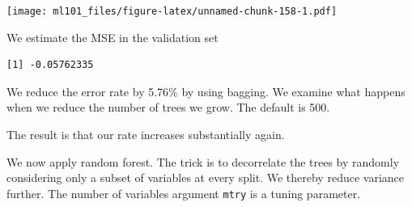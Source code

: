 \documentclass[]{article}
\newenvironment{Shaded}{\begin{snugshade}}{\end{snugshade}}
\newcommand{\CommentTok}[1]{\textcolor[rgb]{0.56,0.35,0.01}{\textit{#1}}}
\newcommand{\DataTypeTok}[1]{\textcolor[rgb]{0.13,0.29,0.53}{#1}}
\newcommand{\DecValTok}[1]{\textcolor[rgb]{0.00,0.00,0.81}{#1}}
\newcommand{\KeywordTok}[1]{\textcolor[rgb]{0.13,0.29,0.53}{\textbf{#1}}}
\newcommand{\NormalTok}[1]{#1}
\newcommand{\OperatorTok}[1]{\textcolor[rgb]{0.81,0.36,0.00}{\textbf{#1}}}
\newcommand{\OtherTok}[1]{\textcolor[rgb]{0.56,0.35,0.01}{#1}}
\newcommand{\StringTok}[1]{\textcolor[rgb]{0.31,0.60,0.02}{#1}}
\begin{document}
\texttt{[image: ml101\_files/figure-latex/unnamed-chunk-158-1.pdf]}

We estimate the MSE in the validation set

\begin{Shaded}
\end{Shaded}

\begin{verbatim}
[1] -0.05762335
\end{verbatim}

We reduce the error rate by 5.76\(\%\) by using bagging. We examine what happens when we reduce the number of trees we grow. The default is 500.

\begin{Shaded}
\end{Shaded}

The result is that our rate increases substantially again.

We now apply random forest. The trick is to decorrelate the trees by randomly considering only a subset of variables at every split. We thereby reduce variance further. The number of variables argument \texttt{mtry} is a tuning parameter.
\end{document}

